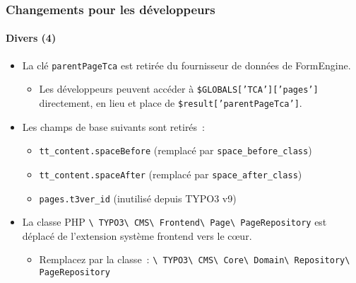 \begin{frame}[fragile]
	\frametitle{Changements pour les développeurs}
	\framesubtitle{Divers (4)}

	\begin{itemize}
		\item La clé \texttt{parentPageTca} est retirée du fournisseur de données de FormEngine.

			\begin{itemize}\smaller
				\item[\ding{228}] Les développeurs peuvent accéder à \texttt{\$GLOBALS['TCA']['pages']} directement,
					en lieu et place de \texttt{\$result['parentPageTca']}.
			\end{itemize}\normalsize

		\item Les champs de base suivants sont retirés~:

			\begin{itemize}\smaller
				\item \texttt{tt\_content.spaceBefore} (remplacé par \texttt{space\_before\_class})
				\item \texttt{tt\_content.spaceAfter} (remplacé par \texttt{space\_after\_class})
				\item \texttt{pages.t3ver\_id} (inutilisé depuis TYPO3 v9)
			\end{itemize}\normalsize

		\item La classe PHP
			\texttt{\textbackslash
				TYPO3\textbackslash
				CMS\textbackslash
				Frontend\textbackslash
				Page\textbackslash
				PageRepository} est déplacé de l'extension système frontend vers le cœur.

			\begin{itemize}\smaller
				\item Remplacez par la classe~:
					\texttt{\textbackslash
						TYPO3\textbackslash
						CMS\textbackslash
						Core\textbackslash
						Domain\textbackslash
						Repository\textbackslash
						PageRepository}
			\end{itemize}\normalsize

	\end{itemize}

\end{frame}


